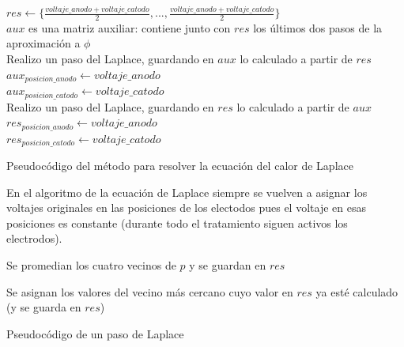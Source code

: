 \documentclass[a4paper]{article}
\begin{document}
\begin{algorithm}[H]
\DontPrintSemicolon
	\;
	$res \leftarrow \Big \{\frac{voltaje\_anodo + voltaje\_catodo}{2}, ... , \frac{voltaje\_anodo + voltaje\_catodo}{2} \Big \}$ \\
	$aux$ es una matriz auxiliar: contiene junto con $res$ los últimos dos pasos de la aproximación a $\phi$ \\

	 {
		Realizo un paso del Laplace, guardando en $aux$ lo calculado a partir de $res$ \\
		$aux_{posicion\_anodo} \leftarrow voltaje\_anodo$ \\
		$aux_{posicion\_catodo} \leftarrow voltaje\_catodo$ \\
		\;
		Realizo un paso del Laplace, guardando en $res$ lo calculado a partir de $aux$ \\
		$res_{posicion\_anodo} \leftarrow voltaje\_anodo$ \\
		$res_{posicion\_catodo} \leftarrow voltaje\_catodo$ \\	
	}

\caption{Pseudocódigo del método para resolver la ecuación del calor de Laplace}
\end{algorithm}

\bigskip
En el algoritmo de la ecuación de Laplace siempre se vuelven a asignar 
los voltajes originales en las posiciones de 
los electodos pues el voltaje en esas posiciones es constante (durante todo el tratamiento
siguen activos los electrodos). \\

\begin{algorithm}[H]
\DontPrintSemicolon
\;
	 {
		Se promedian los cuatro vecinos de $p$ y se guardan en $res$
	}
	
	 {
		Se asignan los valores del vecino más cercano cuyo valor en $res$ ya esté calculado (y se guarda en $res$)
	}

\caption{Pseudocódigo de un paso de Laplace}
\end{algorithm}
\end{document}
